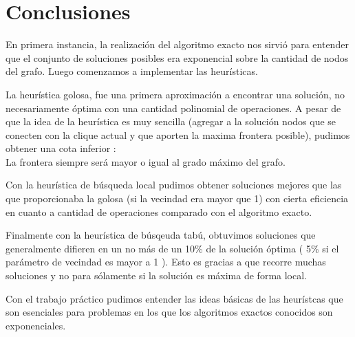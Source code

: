 \section{Conclusiones}
\par{En primera instancia, la realizaci\'on del algoritmo exacto nos sirvi\'o para entender que el conjunto de soluciones
posibles era exponencial sobre la cantidad de nodos del grafo.
Luego comenzamos a implementar las heur\'isticas.}\\

\par{La heur\'istica golosa, fue una primera aproximaci\'on a encontrar una soluci\'on,
no necesariamente \'optima con una cantidad polinomial de operaciones. A pesar de que la idea de la heur\'istica es muy sencilla
(agregar a la soluci\'on nodos que se conecten con la clique actual y que aporten la maxima frontera posible), pudimos obtener una cota
inferior :\\
La frontera siempre ser\'a mayor o igual al grado m\'aximo del grafo.}\\

\par{Con la heur\'istica de búsqueda local pudimos obtener soluciones mejores que las que proporcionaba la golosa (si la vecindad era mayor que 1) con
cierta eficiencia en cuanto a cantidad de operaciones comparado con el algoritmo exacto.}\\

\par{Finalmente con la heurística de búsqeuda tabú, obtuvimos soluciones que generalmente difieren
en un no más de un 10\% de la soluci\'on \'optima ( 5\% si el par\'ametro de vecindad es mayor a 1 ). Esto es gracias a que recorre muchas soluciones
y no para s\'olamente si la soluci\'on es m\'axima de forma local.}\\

\par{Con el trabajo pr\'actico pudimos entender las ideas b\'asicas de las heur\'istcas que son esenciales para problemas en los que los algoritmos exactos
conocidos son exponenciales.}
